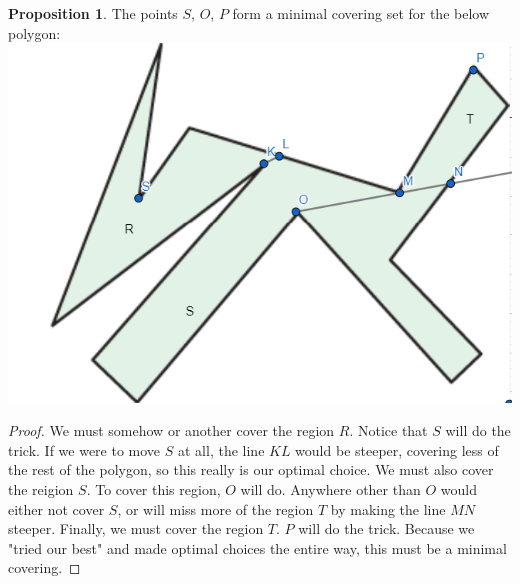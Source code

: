 \documentclass[12pt]{article}
\theoremstyle{definition}
\newtheorem{proposition}{Proposition}
\begin{document}
\begin{proposition}
The points $S$, $O$, $P$ form a minimal covering set for the below polygon:\\


\includegraphics[scale=1]{minimal_3.png}
\end{proposition}

\begin{proof}
We must somehow or another cover the region $R$. Notice that $S$ will do the trick. If we were to move $S$ at all, the line $KL$ would be steeper, covering less of the rest of the polygon, so this really is our optimal choice. We must also cover the reigion $S$. To cover this region, $O$ will do. Anywhere other than $O$ would either not cover $S$, or will miss more of the region $T$ by making the line $MN$ steeper. Finally, we must cover the region $T$. $P$ will do the trick. Because we "tried our best" and made optimal choices the entire way, this must be a minimal covering.
\end{proof}
\end{document}
